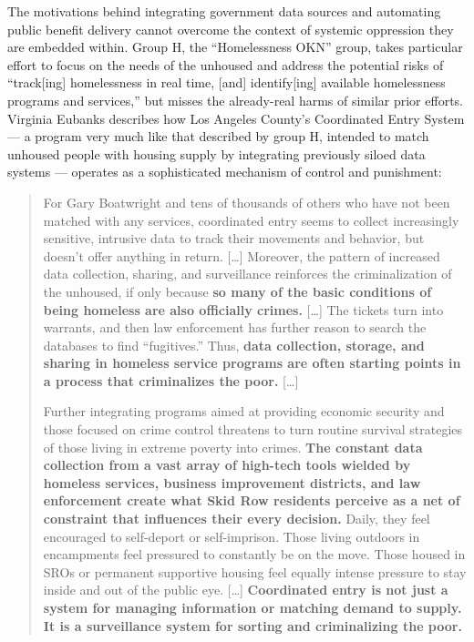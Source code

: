 The motivations behind integrating government data sources and
automating public benefit delivery cannot overcome the context of
systemic oppression they are embedded within. Group H, the
``Homelessness OKN'' group, takes particular effort to focus on the needs of the unhoused and address
the potential risks of ``track{[}ing{]} homelessness in real time,
{[}and{]} identify{[}ing{]} available homelessness programs and
services,'' but misses the already-real harms of similar prior efforts.
Virginia Eubanks describes how Los Angeles County's Coordinated Entry
System --- a program very much like that described by group H, intended
to match unhoused people with housing supply by integrating previously
siloed data systems --- operates as a sophisticated mechanism of control
and punishment:

\begin{quote}
For Gary Boatwright and tens of thousands of others who have not been
matched with any services, coordinated entry seems to collect
increasingly sensitive, intrusive data to track their movements and
behavior, but doesn't offer anything in return. {[}\ldots{]} Moreover,
the pattern of increased data collection, sharing, and surveillance
reinforces the criminalization of the unhoused, if only because
\textbf{so many of the basic conditions of being homeless are also
officially crimes.} {[}\ldots{]} The tickets turn into warrants, and
then law enforcement has further reason to search the databases to find
``fugitives.'' Thus, \textbf{data collection, storage, and sharing in
homeless service programs are often starting points in a process that
criminalizes the poor.} {[}\ldots{]}

Further integrating programs aimed at providing economic security and
those focused on crime control threatens to turn routine survival
strategies of those living in extreme poverty into crimes. \textbf{The
constant data collection from a vast array of high-tech tools wielded by
homeless services, business improvement districts, and law enforcement
create what Skid Row residents perceive as a net of constraint that
influences their every decision.} Daily, they feel encouraged to
self-deport or self-imprison. Those living outdoors in encampments feel
pressured to constantly be on the move. Those housed in SROs or
permanent supportive housing feel equally intense pressure to stay
inside and out of the public eye. {[}\ldots{]} \textbf{Coordinated entry
is not just a system for managing information or matching demand to
supply. It is a surveillance system for sorting and criminalizing the
poor.} \cite{eubanksAutomatingInequalityHow2019} 
\end{quote}


